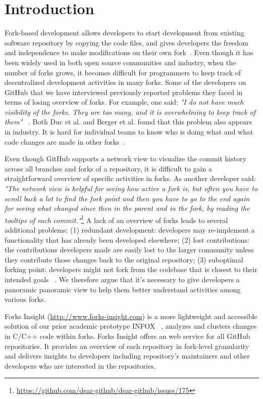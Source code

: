 \section{Introduction}
Fork-based development allows developers to start development from existing software repository by copying the code files, and gives developers the freedom and independence to make modifications on their own fork~\cite{dubinsky2013exploratory, bitzer2006impact, ernst2010code,vetter2007open}. Even though it has been widely used in both open source communities and industry, when the number of forks grows, it becomes difficult for programmers to keep track of decentralized development activities in many forks. Some of the developers on GitHub that we have interviewed previously reported problems they faced in terms of losing overview of forks. For example, one said: \emph{"I do not have much visibility of the forks. They are too many, and it is overwhelming to keep track of them"} ~\cite{ZSLXWK:ICSE18}. Both Duc et al. and Berger et al. found that this problem also appears in industry. It is hard for individual teams to know who is doing what and what code changes are made in other forks~\cite{berger2014three,Duc:2014:FCM:2652524.2652546}.

Even though GitHub supports a network view to visualize the commit history across all branches and forks of a repository, it is difficult to gain a straightforward overview of specific activities in forks. As another developer said: \emph{"The network view is helpful for seeing how active a fork is, but often you have to scroll back a lot to find the fork point and then you have to go to the end again for seeing what changed since then in the parent and in the fork, by reading the tooltips of each commit."}\footnote{\url{https://github.com/dear-github/dear-github/issues/175}}
 A lack of an overview of forks leads to several additional problems: (1) redundant development: developers may re-implement a functionality that has already been developed elsewhere; (2) lost contributions: the contributions developers made are easily lost to the larger community unless they contribute those changes back to the original repository; (3) suboptimal forking point: developers might not fork from the codebase that is closest to their intended goals ~\cite{ZSLXWK:ICSE18, dubinsky2013exploratory,stanciulescu2015forked}. We therefore argue that it's necessary to give developers a panoramic panoramic view to help them better understand activities among various forks.

Forks Insight (\url{http://www.forks-insight.com}) is a more lightweight and accessible solution of our prior academic prototype INFOX ~\cite{ZSLXWK:ICSE18}, analyzes and clusters changes in C/C++ code within forks. Forks Insight offers an web service for all GitHub repositories. It provides an overview of each repository in fork-level granularity and delivers insights to developers including repository's maintainers and other developers who are interested in the repositories.


